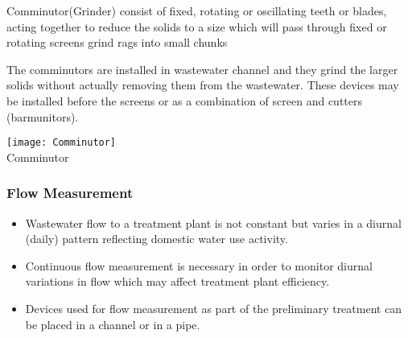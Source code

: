 \documentclass{article}
\begin{document}
					\begin{itemize}
\begin{minipage}{\textwidth}	\item Comminutor(Grinder) consist of fixed, rotating or oscillating teeth or blades, acting together to reduce the solids to a size which will pass through fixed or rotating screens grind rags into small chunks
\item The comminutors are installed in wastewater channel and they grind the larger solids without actually removing them from the wastewater.  These devices may be installed before the screens or as a combination of screen and cutters (barmunitors).
					\end{minipage}	
					\end{itemize}
					\begin{minipage}{\textwidth}
					\begin{center}
      \texttt{[image: Comminutor]}\\
      Comminutor\\
\end{center}
    \end{minipage}
  
		\subsubsection{Flow Measurement}
					\begin{itemize}
						\item Wastewater flow to a treatment plant is not constant but varies in a diurnal (daily) pattern reflecting domestic water use activity.
						\item Continuous flow measurement is necessary in order to monitor diurnal variations in flow which may affect treatment plant efficiency.\\
						\item Devices used for flow measurement as part of the preliminary treatment can be placed in a channel or in a pipe.
					\end{itemize}
\end{document}
